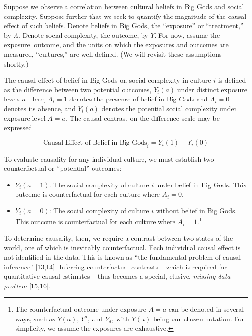 \documentclass[
  singlecolumn]{article}
\providecommand{\tightlist}{%
  \setlength{\itemsep}{0pt}\setlength{\parskip}{0pt}}\usepackage{longtable,booktabs,array}
\begin{document}
Suppose we observe a correlation between cultural beliefs in Big Gods
and social complexity. Suppose further that we seek to quantify the
magnitude of the causal effect of such beliefs. Denote beliefs in Big
Gods, the ``exposure'' or ``treatment,'' by \(A\). Denote social
complexity, the outcome, by \(Y\). For now, assume the exposure,
outcome, and the units on which the exposures and outcomes are measured,
``cultures,'' are well-defined. (We will revisit these assumptions
shortly.)

The causal effect of belief in Big Gods on social complexity in culture
\(i\) is defined as the difference between two potential outcomes,
\(Y_i(a)\) under distinct exposure levels \(a\). Here, \(A_i = 1\)
denotes the presence of belief in Big Gods and \(A_i = 0\) denotes its
absence, and \(Y_i(a)\) denotes the potential social complexity under
exposure level \(A = a\). The causal contrast on the difference scale
may be expressed

\[
\text{Causal Effect of Belief in Big Gods}_i = Y_i(1) - Y_i(0) 
\]

To evaluate causality for any individual culture, we must establish two
counterfactual or ``potential'' outcomes:

\begin{itemize}
\tightlist
\item
  \(Y_i(a = 1)\): The social complexity of culture \(i\) under belief in
  Big Gods. This outcome is counterfactual for each culture where
  \(A_i = 0\).
\item
  \(Y_i(a = 0)\): The social complexity of culture \(i\) without belief
  in Big Gods. This outcome is counterfactual for each culture where
  \(A_i = 1\).\footnote{The counterfactual outcome under exposure
    \(A = a\) can be denoted in several ways, such as \(Y(a)\),
    \(Y^{a}\), and \(Y_a\), with \(Y(a)\) being our chosen notation. For
    simplicity, we assume the exposures are exhaustive.}
\end{itemize}

To determine causality, then, we require a contrast between two states
of the world, one of which is inevitably counterfactual. Each individual
causal effect is not identified in the data. This is known as ``the
fundamental problem of causal inference''
{[}\protect\hyperlink{ref-rubin1976}{13},\protect\hyperlink{ref-holland1986}{14}{]}.
Inferring counterfactual contrasts -- which is required for quantitative
causal estimates -- thus becomes a special, elusive, \emph{missing data
problem}
{[}\protect\hyperlink{ref-westreich2015}{15},\protect\hyperlink{ref-edwards2015}{16}{]}.
\end{document}

